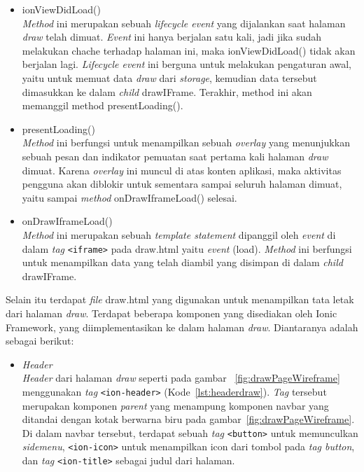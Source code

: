 \begin{enumerate}
	\begin{itemize}
		\item ionViewDidLoad() \\
		\textit{Method} ini merupakan sebuah \textit{lifecycle event} yang dijalankan saat halaman \textit{draw} telah dimuat. \textit{Event} ini hanya berjalan satu kali, jadi jika sudah melakukan chache terhadap halaman ini, maka ionViewDidLoad() tidak akan berjalan lagi. \textit{Lifecycle event} ini berguna untuk melakukan pengaturan awal, yaitu untuk memuat data \textit{draw} dari \textit{storage}, kemudian data tersebut dimasukkan ke dalam \textit{child} drawIFrame. Terakhir, method ini akan memanggil method presentLoading().
		\newpage
		\item presentLoading() \\
		\textit{Method} ini berfungsi untuk menampilkan sebuah \textit{overlay} yang menunjukkan sebuah pesan dan indikator pemuatan saat pertama kali halaman \textit{draw} dimuat. Karena \textit{overlay} ini muncul di atas konten aplikasi, maka aktivitas pengguna akan diblokir untuk sementara sampai seluruh halaman dimuat, yaitu sampai \textit{method} onDrawIframeLoad() selesai.
		\item onDrawIframeLoad() \\
		\textit{Method} ini merupakan sebuah \textit{template statement} dipanggil oleh \textit{event} di dalam \textit{tag} \texttt{<iframe>} pada draw.html yaitu \textit{event} (load). \textit{Method} ini berfungsi untuk menampilkan data yang telah diambil yang disimpan di dalam \textit{child} drawIFrame.
	\end{itemize}
	
	Selain itu terdapat \textit{file} draw.html yang digunakan untuk menampilkan tata letak dari halaman \textit{draw}. Terdapat beberapa komponen yang disediakan oleh Ionic Framework, yang diimplementasikan ke dalam halaman \textit{draw}. Diantaranya adalah sebagai berikut:	
	
	\begin{itemize}
		\item \textit{Header} \\
		\textit{Header} dari halaman \textit{draw} seperti pada gambar ~\ref{fig:drawPageWireframe} menggunakan \textit{tag} \texttt{<ion-header>} (Kode~\ref{lst:headerdraw}). \textit{Tag} tersebut merupakan komponen \textit{parent} yang menampung komponen navbar yang ditandai dengan kotak berwarna biru pada gambar~\ref{fig:drawPageWireframe}. Di dalam navbar tersebut, terdapat sebuah \textit{tag} \texttt{<button>} untuk memunculkan \textit{sidemenu}, \texttt{<ion-icon>} untuk menampilkan icon dari tombol pada \textit{tag button}, dan \textit{tag} \texttt{<ion-title>} sebagai judul dari halaman.


\end{itemize}
\end{enumerate}
